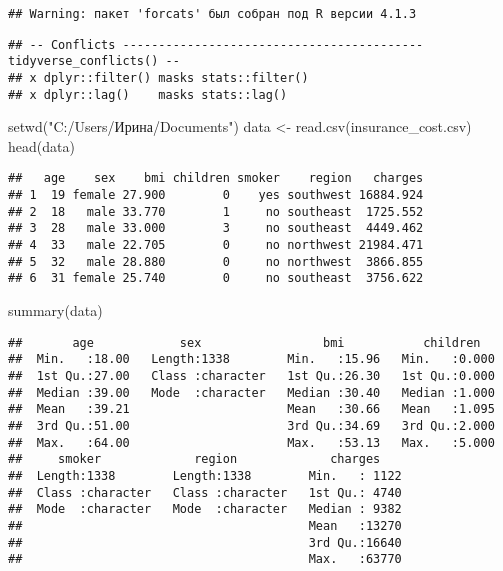 \documentclass[
]{article}
\newenvironment{Shaded}{\begin{snugshade}}{\end{snugshade}}
\newcommand{\FunctionTok}[1]{\textcolor[rgb]{0.00,0.00,0.00}{#1}}
\newcommand{\NormalTok}[1]{#1}
\newcommand{\OtherTok}[1]{\textcolor[rgb]{0.56,0.35,0.01}{#1}}
\newcommand{\StringTok}[1]{\textcolor[rgb]{0.31,0.60,0.02}{#1}}
\begin{document}
\begin{verbatim}
## Warning: пакет 'forcats' был собран под R версии 4.1.3
\end{verbatim}

\begin{verbatim}
## -- Conflicts ------------------------------------------ tidyverse_conflicts() --
## x dplyr::filter() masks stats::filter()
## x dplyr::lag()    masks stats::lag()
\end{verbatim}

\begin{Shaded}
\begin{Highlighting}[]
\FunctionTok{setwd}\NormalTok{(}\StringTok{"C:/Users/Ирина/Documents"}\NormalTok{) }
\NormalTok{data }\OtherTok{\textless{}{-}} \FunctionTok{read.csv}\NormalTok{(}\StringTok{\textquotesingle{}insurance\_cost.csv\textquotesingle{}}\NormalTok{)}
\FunctionTok{head}\NormalTok{(data)}
\end{Highlighting}
\end{Shaded}

\begin{verbatim}
##   age    sex    bmi children smoker    region   charges
## 1  19 female 27.900        0    yes southwest 16884.924
## 2  18   male 33.770        1     no southeast  1725.552
## 3  28   male 33.000        3     no southeast  4449.462
## 4  33   male 22.705        0     no northwest 21984.471
## 5  32   male 28.880        0     no northwest  3866.855
## 6  31 female 25.740        0     no southeast  3756.622
\end{verbatim}

\begin{Shaded}
\begin{Highlighting}[]
\FunctionTok{summary}\NormalTok{(data)}
\end{Highlighting}
\end{Shaded}

\begin{verbatim}
##       age            sex                 bmi           children    
##  Min.   :18.00   Length:1338        Min.   :15.96   Min.   :0.000  
##  1st Qu.:27.00   Class :character   1st Qu.:26.30   1st Qu.:0.000  
##  Median :39.00   Mode  :character   Median :30.40   Median :1.000  
##  Mean   :39.21                      Mean   :30.66   Mean   :1.095  
##  3rd Qu.:51.00                      3rd Qu.:34.69   3rd Qu.:2.000  
##  Max.   :64.00                      Max.   :53.13   Max.   :5.000  
##     smoker             region             charges     
##  Length:1338        Length:1338        Min.   : 1122  
##  Class :character   Class :character   1st Qu.: 4740  
##  Mode  :character   Mode  :character   Median : 9382  
##                                        Mean   :13270  
##                                        3rd Qu.:16640  
##                                        Max.   :63770
\end{verbatim}
\end{document}
